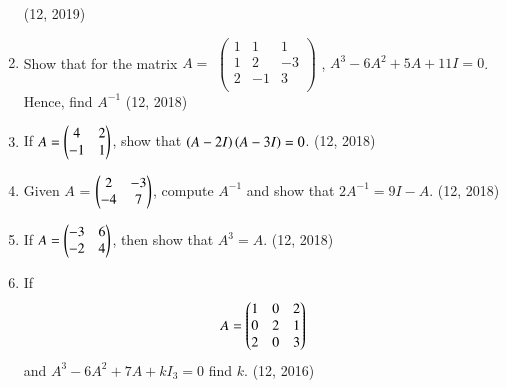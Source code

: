 \begin{enumerate}[label=\thesubsection.\arabic*,ref=\thesubsection.\theenumi]
\hfill (12, 2019)
\item Show that for the matrix $A=$ $\begin{pmatrix}
  1 & 1 &  1 \\
  1 & 2 & -3 \\
  2 & -1 & 3 \\
\end{pmatrix}$ , ${A}^3 - 6{A}^2 + 5{A} +11 I = 0$.\\
Hence, find ${A}^{-1}$
\hfill (12, 2018)
\item If $A= \begin{pmatrix} 4 & 2 \\ -1 & 1 \\\end{pmatrix}$, show that $\left(A-2I\right)\left(A-3I\right)=0$.
\hfill (12, 2018)
\item Given $A$ = $\begin{pmatrix} 2 & -3 \\ -4 & 7 \end{pmatrix}$, compute $A^{-1}$ and show that $2A^{-1} = 9I-A$.
\hfill (12, 2018)
\item If $A=\begin{pmatrix} -3 & 6 \\ -2 & 4\end{pmatrix}$, then show that ${A}^3=A$.
\hfill (12, 2018)
    \item If
          \begin{align*}
              A = \begin{pmatrix}1 & 0 & 2  \\
              0            & 2 & 1  \\
              2            & 0 & 3\end{pmatrix}
          \end{align*}
          and $A^3-6A^2+7A+kI_3=0$ find $k$.
\hfill (12, 2016)
\end{enumerate}
